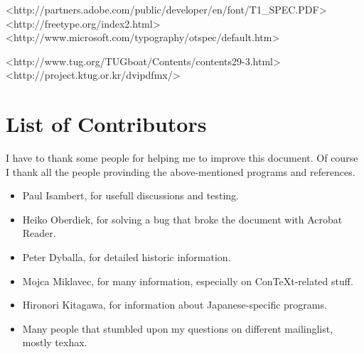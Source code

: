 	<http://partners.adobe.com/public/developer/en/font/T1_SPEC.PDF>
	<http://freetype.org/index2.html>
	<http://www.microsoft.com/typography/otspec/default.htm>

	<http://www.tug.org/TUGboat/Contents/contents29-3.html>
	<http://project.ktug.or.kr/dvipdfmx/>

\clearpage
\section{List of Contributors}
I have to thank some people for helping me to improve this document. Of course I thank all the people provinding the above-mentioned programs and references.

\begin{itemize}
\item Paul Isambert, for usefull discussions and testing.
\item Heiko Oberdiek, for solving a bug that broke the document with Acrobat Reader.
\item Peter Dyballa, for detailed historic information.
\item Mojca Miklavec, for many information, especially on Con\TeX t-related stuff.
\item Hironori Kitagawa, for information about Japanese-specific programs.

\item Many people that stumbled upon my questions on different mailinglist, mostly texhax.
\end{itemize}
